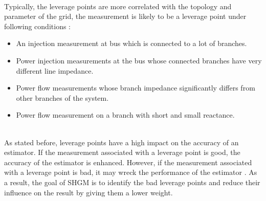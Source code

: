 \bigskip
\\Typically, the leverage points are more correlated with the topology and parameter of the grid, the measurement is likely to be a leverage point under following conditions \cite{gomez2004power}:
\begin{itemize}
    \item An injection measurement at bus which is connected to a lot of branches.
    \item Power injection measurements at the bus whose connected branches have very different line impedance.
    \item Power flow measurements whose branch impedance significantly differs from other branches of the system.
    \item Power flow measurement on a branch with short and small reactance.
\end{itemize}
\\As stated before, leverage points have a high impact on the accuracy of an estimator. If the measurement associated with a leverage point is good, the accuracy of the estimator is enhanced. However, if the measurement associated with a leverage point is bad, it may wreck the performance of the estimator \cite{rousseeuw1993alternatives}. As a result, the goal of SHGM is to identify the bad leverage points and reduce their influence on the result by giving them a lower weight. 

